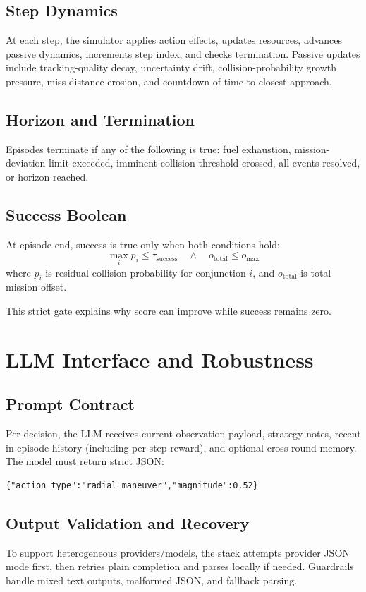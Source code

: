 \documentclass[conference]{IEEEtran}
\begin{document}
\subsection{Step Dynamics}
At each step, the simulator applies action effects, updates resources, advances passive dynamics, increments step index, and checks termination. Passive updates include tracking-quality decay, uncertainty drift, collision-probability growth pressure, miss-distance erosion, and countdown of time-to-closest-approach.

\subsection{Horizon and Termination}
Episodes terminate if any of the following is true: fuel exhaustion, mission-deviation limit exceeded, imminent collision threshold crossed, all events resolved, or horizon reached.

\subsection{Success Boolean}
At episode end, success is true only when both conditions hold:
\begin{equation}
\max_i p_i \leq \tau_{\text{success}} \quad \land \quad o_{\text{total}} \leq o_{\max}
\end{equation}
where $p_i$ is residual collision probability for conjunction $i$, and $o_{\text{total}}$ is total mission offset.

This strict gate explains why score can improve while success remains zero.

\section{LLM Interface and Robustness}
\subsection{Prompt Contract}
Per decision, the LLM receives current observation payload, strategy notes, recent in-episode history (including per-step reward), and optional cross-round memory. The model must return strict JSON:
\begin{verbatim}
{"action_type":"radial_maneuver","magnitude":0.52}
\end{verbatim}

\subsection{Output Validation and Recovery}
To support heterogeneous providers/models, the stack attempts provider JSON mode first, then retries plain completion and parses locally if needed. Guardrails handle mixed text outputs, malformed JSON, and fallback parsing.
\end{document}
